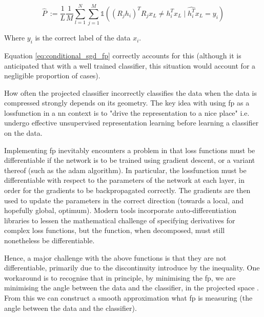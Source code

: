 \begin{equation}
\label{eq:conditional_sgd_fp}
\hat{P}\ := \frac{1}{L}\frac{1}{M}\sum_{l = 1}^N \sum_{j = 1}^M  \mathds{1}( (R_j h_i)^T R_jx_L \neq h_i^Tx_L \mid \hat{h_i^T}x_L = y_i )  
\end{equation}

Where $y_i$ is the correct label of the data $x_i$. 
\bigskip

Equation \ref{eq:conditional_sgd_fp} correctly accounts for this (although it is anticipated that with a well trained classifier, this situation would account for a negligible proportion of cases). 
\bigskip

How often the projected classifier incorrectly classifies the data when the data is compressed strongly depends on its geometry. The key idea with using \gls{fp} as a \gls{lossfunction} in a \gls{nn} context is to "drive the representation to a nice place" i.e. undergo effective unsupervised representation learning before learning a classifier on the data. 
\bigskip


Implementing  \gls{fp} inevitably encounters a problem in that loss functions must be differentiable if the network is to be trained using gradient descent, or a variant thereof (such as the \gls{adam} algorithm). In particular, the \gls{lossfunction} must be differentiable with respect to the parameters of the network at each layer, in order for the gradients to be backpropagated correctly. The gradients are then used to update the parameters in the correct direction (towards a local, and hopefully global, optimum). Modern tools incorporate auto-differentiation libraries to lessen the mathematical challenge of specifying derivatives for complex loss functions, but the function, when decomposed, must still nonetheless be differentiable.
\bigskip


Hence, a major challenge with the above functions is that they are not differentiable, primarily due to the discontinuity introduce by the inequality. One workaround is to recognise that in principle, by minimising the \gls{fp}, we are minimising the angle between the data and the classifier, in the projected space \cite[p.~3]{bob_rp_storage}. From this we can construct a smooth approximation what \gls{fp} is measuring (the angle between the data and the classifier).

